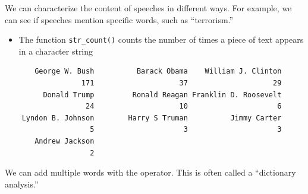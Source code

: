 \documentclass[
  letterpaper,
  DIV=11,
  numbers=noendperiod]{scrreprt}
\newenvironment{Shaded}{\begin{snugshade}}{\end{snugshade}}
\newcommand{\AttributeTok}[1]{\textcolor[rgb]{0.40,0.45,0.13}{#1}}
\newcommand{\DecValTok}[1]{\textcolor[rgb]{0.68,0.00,0.00}{#1}}
\newcommand{\FunctionTok}[1]{\textcolor[rgb]{0.28,0.35,0.67}{#1}}
\newcommand{\NormalTok}[1]{\textcolor[rgb]{0.00,0.23,0.31}{#1}}
\newcommand{\OtherTok}[1]{\textcolor[rgb]{0.00,0.23,0.31}{#1}}
\newcommand{\SpecialCharTok}[1]{\textcolor[rgb]{0.37,0.37,0.37}{#1}}
\newcommand{\StringTok}[1]{\textcolor[rgb]{0.13,0.47,0.30}{#1}}
\providecommand{\tightlist}{%
  \setlength{\itemsep}{0pt}\setlength{\parskip}{0pt}}\usepackage{longtable,booktabs,array}
\begin{document}
We can characterize the content of speeches in different ways. For
example, we can see if speeches mention specific words, such as
``terrorism.''

\begin{itemize}
\tightlist
\item
  The function \texttt{str\_count()} counts the number of times a piece
  of text appears in a character string
\end{itemize}

\begin{Shaded}
\end{Shaded}

\begin{Shaded}
\end{Shaded}

\begin{verbatim}
       George W. Bush          Barack Obama    William J. Clinton 
                  171                    37                    29 
         Donald Trump         Ronald Reagan Franklin D. Roosevelt 
                   24                    10                     6 
    Lyndon B. Johnson        Harry S Truman          Jimmy Carter 
                    5                     3                     3 
       Andrew Jackson 
                    2 
\end{verbatim}

We can add multiple words with the \textbar{} operator. This is often
called a ``dictionary analysis.''

\begin{Shaded}
\end{Shaded}
\end{document}
